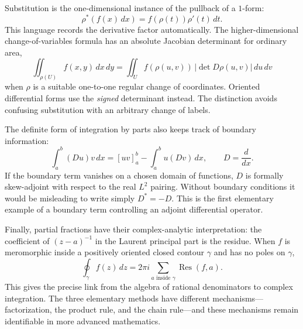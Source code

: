 Substitution is the one-dimensional instance of the pullback of a \(1\)-form:
\[
 \rho^*(f(x)\,dx)=f(\rho(t))\rho'(t)\,dt.
\]
This language records the derivative factor automatically. The higher-dimensional change-of-variables formula has an absolute Jacobian determinant for ordinary area,
\[
 \iint_{\rho(U)} f(x,y)\,dx\,dy
 =\iint_U f(\rho(u,v))\,|\det D\rho(u,v)|\,du\,dv
\]
when \(\rho\) is a suitable one-to-one regular change of coordinates. Oriented differential forms use the \emph{signed} determinant instead. The distinction avoids confusing substitution with an arbitrary change of labels.

The definite form of integration by parts also keeps track of boundary information:
\[
 \int_a^b (Du)v\,dx=[uv]_a^b-\int_a^b u(Dv)\,dx,
 \qquad D=\frac d{dx}.
\]
If the boundary term vanishes on a chosen domain of functions, \(D\) is formally skew-adjoint with respect to the real \(L^2\) pairing. Without boundary conditions it would be misleading to write simply \(D^*=-D\). This is the first elementary example of a boundary term controlling an adjoint differential operator.

Finally, partial fractions have their complex-analytic interpretation: the coefficient of \((z-a)^{-1}\) in the Laurent principal part is the residue. When \(f\) is meromorphic inside a positively oriented closed contour \(\gamma\) and has no poles on \(\gamma\),
\[
 \oint_\gamma f(z)\,dz
 =2\pi i\sum_{a\text{ inside }\gamma}\operatorname{Res}(f,a).
\]
This gives the precise link from the algebra of rational denominators to complex integration. The three elementary methods have different mechanisms---factorization, the product rule, and the chain rule---and these mechanisms remain identifiable in more advanced mathematics.
